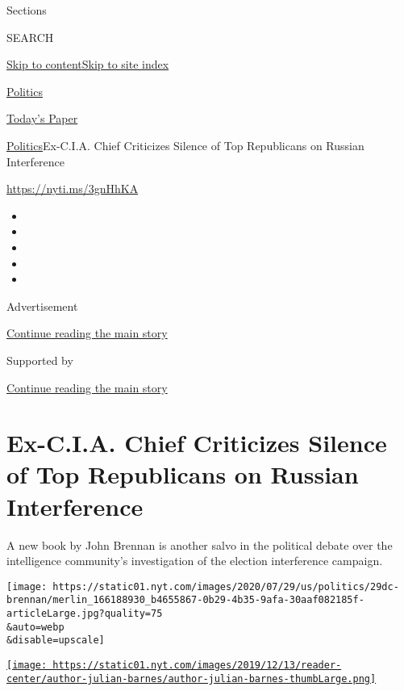 Sections

SEARCH

\protect\hyperlink{site-content}{Skip to
content}\protect\hyperlink{site-index}{Skip to site index}

\href{https://www.nytimes.com/section/politics}{Politics}

\href{https://myaccount.nytimes.com/auth/login?response_type=cookie\&client_id=vi}{}

\href{https://www.nytimes.com/section/todayspaper}{Today's Paper}

\href{/section/politics}{Politics}\textbar{}Ex-C.I.A. Chief Criticizes
Silence of Top Republicans on Russian Interference

\url{https://nyti.ms/3gnHhKA}

\begin{itemize}
\item
\item
\item
\item
\item
\end{itemize}

Advertisement

\protect\hyperlink{after-top}{Continue reading the main story}

Supported by

\protect\hyperlink{after-sponsor}{Continue reading the main story}

\hypertarget{ex-cia-chief-criticizes-silence-of-top-republicans-on-russian-interference}{%
\section{Ex-C.I.A. Chief Criticizes Silence of Top Republicans on
Russian
Interference}\label{ex-cia-chief-criticizes-silence-of-top-republicans-on-russian-interference}}

A new book by John Brennan is another salvo in the political debate over
the intelligence community's investigation of the election interference
campaign.

\texttt{[image: https://static01.nyt.com/images/2020/07/29/us/politics/29dc-brennan/merlin\_166188930\_b4655867-0b29-4b35-9afa-30aaf082185f-articleLarge.jpg?quality=75\\\&auto=webp\\\&disable=upscale]}

\href{https://www.nytimes.com/by/julian-e-barnes}{\texttt{[image: https://static01.nyt.com/images/2019/12/13/reader-center/author-julian-barnes/author-julian-barnes-thumbLarge.png]}}

